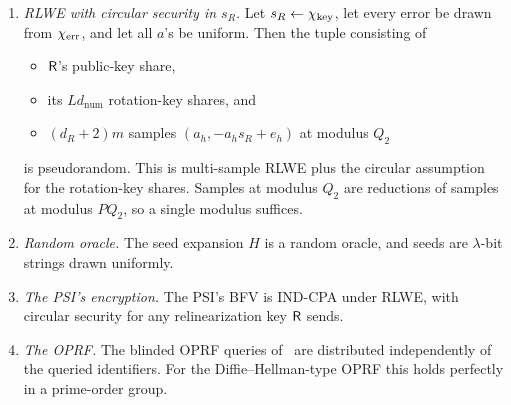\begin{assumption}\label{as:G1}
\begin{enumerate}[nosep,label=(\alph*)]
  \item \emph{RLWE with circular security in $s_R$.} Let $s_R\gets\chi_{\mathrm{key}}$, let every error be drawn from $\chi_{\mathrm{err}}$, and let all $a$'s be uniform. Then the tuple consisting of
  \begin{itemize}[nosep]
    \item $\mathsf{R}$'s public-key share,
    \item its $Ld_{\mathrm{num}}$ rotation-key shares, and
    \item $(d_R+2)m$ samples $(a_h,-a_hs_R+e_h)$ at modulus $Q_2$
  \end{itemize}
  is pseudorandom. This is multi-sample RLWE plus the circular assumption for the rotation-key shares. Samples at modulus $Q_2$ are reductions of samples at modulus $PQ_2$, so a single modulus suffices.
  \item \emph{Random oracle.} The seed expansion $H$ is a random oracle, and seeds are $\lambda$-bit strings drawn uniformly.
  \item \emph{The PSI's encryption.} The PSI's BFV is IND-CPA under RLWE, with circular security for any relinearization key $\mathsf{R}$ sends.
  \item \emph{The OPRF.} The blinded OPRF queries of~\cite{CHLR18} are distributed independently of the queried identifiers. For the Diffie--Hellman-type OPRF this holds perfectly in a prime-order group. 
\end{enumerate}
\end{assumption}

